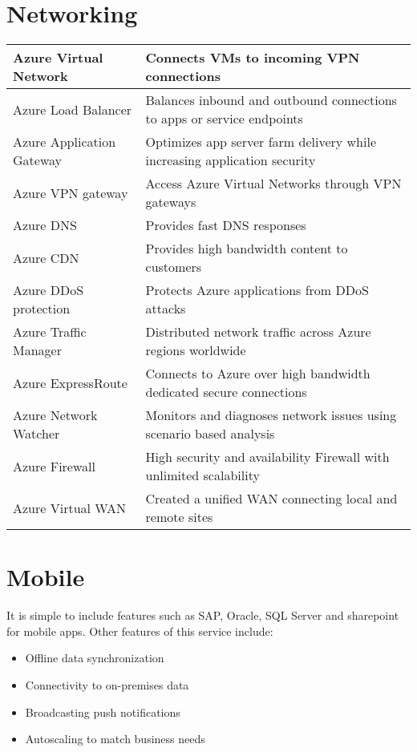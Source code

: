 \documentclass{article}[18pt]
\begin{document}
\section{Networking}
{\renewcommand{\arraystretch}{2}
	\begin{tabularx}{\textwidth}{X X}
		
		Azure Virtual Network& Connects VMs to incoming VPN connections\\
		\hline
		Azure Load Balancer& Balances inbound and outbound connections to apps or service endpoints\\
		\hline
		Azure Application Gateway&Optimizes app server farm delivery while increasing application security\\
		\hline
		Azure VPN gateway& Access Azure Virtual Networks through VPN gateways\\
		\hline
		Azure DNS& Provides fast DNS responses\\
		\hline
		Azure CDN&Provides high bandwidth content to customers\\
		\hline
		Azure DDoS protection& Protects Azure applications from DDoS attacks\\
		\hline
		Azure Traffic Manager& Distributed network traffic across Azure regions worldwide\\
		\hline
		Azure ExpressRoute& Connects to Azure over high bandwidth dedicated secure connections\\
		\hline
		Azure Network Watcher& Monitors and diagnoses network issues using scenario based analysis\\
		\hline
		Azure Firewall& High security and availability Firewall with unlimited scalability\\
		\hline
		Azure Virtual WAN& Created a unified WAN connecting local and remote sites
		
		
	\end{tabularx}
}
\section{Mobile}
It is simple to include features such as SAP, Oracle, SQL Server and sharepoint for mobile apps. Other features of this service include:
\begin{itemize}
	\item Offline data synchronization
	\item Connectivity to on-premises data
	\item Broadcasting push notifications
	\item Autoscaling to match business needs
\end{itemize}
\end{document}
